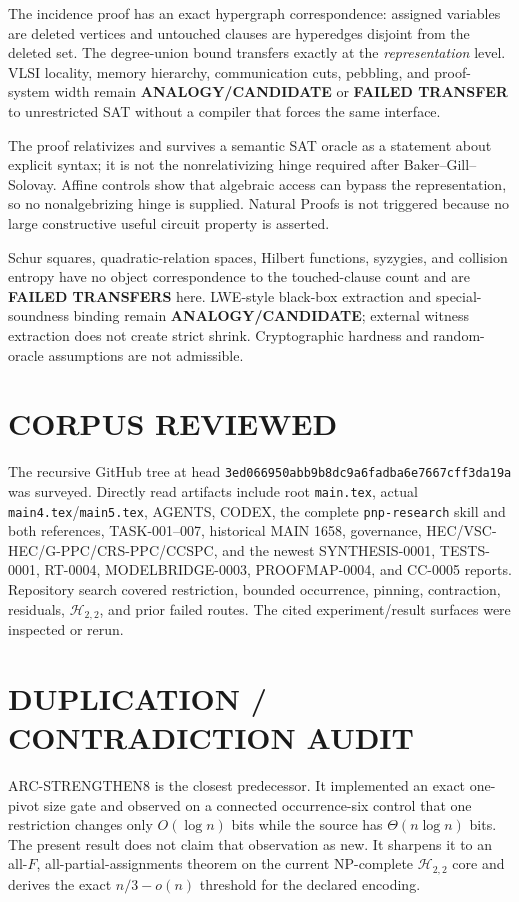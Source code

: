 \documentclass[11pt]{article}
\begin{document}
The incidence proof has an exact hypergraph correspondence: assigned
variables are deleted vertices and untouched clauses are hyperedges disjoint
from the deleted set.  The degree-union bound transfers exactly at the
\emph{representation} level.  VLSI locality, memory hierarchy,
communication cuts, pebbling, and proof-system width remain
\textbf{ANALOGY/CANDIDATE} or \textbf{FAILED TRANSFER} to unrestricted SAT
without a compiler that forces the same interface.

The proof relativizes and survives a semantic SAT oracle as a statement
about explicit syntax; it is not the nonrelativizing hinge required after
Baker--Gill--Solovay.  Affine controls show that algebraic access can bypass
the representation, so no nonalgebrizing hinge is supplied.  Natural Proofs
is not triggered because no large constructive useful circuit property is
asserted.

Schur squares, quadratic-relation spaces, Hilbert functions, syzygies, and
collision entropy have no object correspondence to the touched-clause count
and are \textbf{FAILED TRANSFERS} here.  LWE-style black-box extraction and
special-soundness binding remain \textbf{ANALOGY/CANDIDATE}; external
witness extraction does not create strict shrink.  Cryptographic hardness
and random-oracle assumptions are not admissible.

\section{CORPUS REVIEWED}
The recursive GitHub tree at head
\nolinkurl{3ed066950abb9b8dc9a6fadba6e7667cff3da19a} was surveyed.
Directly read artifacts include root \texttt{main.tex}, actual
\texttt{main4.tex}/\texttt{main5.tex}, AGENTS, CODEX, the complete
\texttt{pnp-research} skill and both references, TASK-001--007, historical
MAIN 1658, governance, HEC/VSC-HEC/G-PPC/CRS-PPC/CCSPC, and the newest
SYNTHESIS-0001, TESTS-0001, RT-0004, MODELBRIDGE-0003, PROOFMAP-0004, and
CC-0005 reports.  Repository search covered restriction, bounded occurrence,
pinning, contraction, residuals, $\mathcal H_{2,2}$, and prior failed routes.
The cited experiment/result surfaces were inspected or rerun.

\section{DUPLICATION / CONTRADICTION AUDIT}
ARC-STRENGTHEN8 is the closest predecessor.  It implemented an exact
one-pivot size gate and observed on a connected occurrence-six control that
one restriction changes only $O(\log n)$ bits while the source has
$\Theta(n\log n)$ bits.  The present result does not claim that observation
as new.  It sharpens it to an all-$F$, all-partial-assignments theorem on the
current NP-complete $\mathcal H_{2,2}$ core and derives the exact
$n/3-o(n)$ threshold for the declared encoding.
\end{document}
